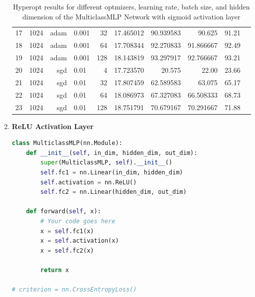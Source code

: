 \begin{solve}
\begin{enumerate}
\begin{table}[H]
\begin{tabular}{rlrlrrrrrr}
            17 & 1024 & adam & 0.001& 32 & 17.465012 & 90.939583 & 90.625& 91.21 \\
            18 & 1024 & adam & 0.001& 64 & 17.708344 & 92.270833 & 91.866667 & 92.49 \\
            19 & 1024 & adam & 0.001& 128 & 18.143819 & 93.297917 & 92.766667 & 93.21 \\
            \rowcolor{red!50}
            20 & 1024 & sgd & 0.01 & 4 & 17.723570 & 20.575& 22.00 & 23.66 \\
            21 & 1024 & sgd & 0.01 & 32 & 17.807459 & 62.589583 & 63.075& 65.17 \\
            22 & 1024 & sgd & 0.01 & 64 & 18.086973 & 67.327083 & 66.508333 & 68.73 \\
            23 & 1024 & sgd & 0.01 & 128 & 18.751791 & 70.679167 & 70.291667 & 71.88 \\
            \bottomrule
            \end{tabular}
            \caption{Hyperopt results for different optmizers, learning rate, batch size, and hidden dimension of the MulticlassMLP Network with sigmoid activation layer}
            \label{TableHyperoptSigmoid}
        \end{table}
        \item \textbf{ReLU Activation Layer}

        \begin{lstlisting}[language=python]
class MulticlassMLP(nn.Module):
    def __init__(self, in_dim, hidden_dim, out_dim):
        super(MulticlassMLP, self).__init__()
        self.fc1 = nn.Linear(in_dim, hidden_dim)
        self.activation = nn.ReLU()
        self.fc2 = nn.Linear(hidden_dim, out_dim)
        
    def forward(self, x):
        # Your code goes here
        x = self.fc1(x)
        x = self.activation(x)
        x = self.fc2(x)
        
        return x

# criterion = nn.CrossEntropyLoss()
    \end{lstlisting}



\end{enumerate}
\end{solve}
